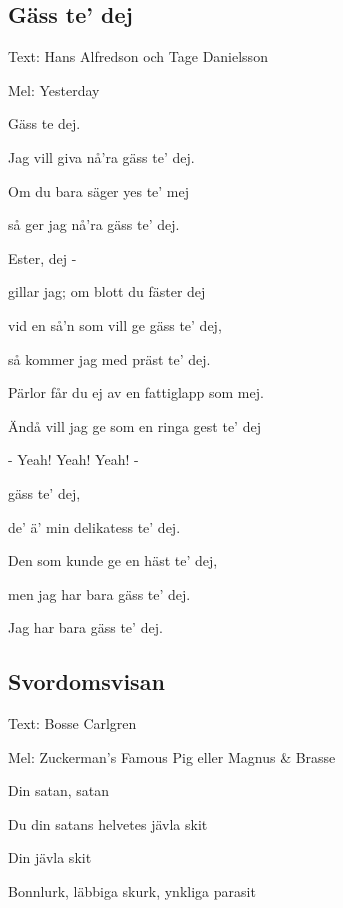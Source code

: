 

\pagestyle{Övriga visor}



\subsection{\textbf{Gäss te’ dej}}

Text: Hans Alfredson och Tage Danielsson

Mel: Yesterday \bigskip


Gäss te dej.

Jag vill giva nå’ra gäss te’ dej.

Om du bara säger yes te’ mej

så ger jag nå’ra gäss te’ dej.

Ester, dej -

gillar jag; om blott du fäster dej

vid en så’n som vill ge gäss te’ dej,

så kommer jag med präst te’ dej. \bigskip



Pärlor får du ej av en fattiglapp som mej.

Ändå vill jag ge som en ringa gest te’ dej

- Yeah! Yeah! Yeah! - \bigskip



gäss te’ dej,

de’ ä’ min delikatess te’ dej.

Den som kunde ge en häst te’ dej,

men jag har bara gäss te’ dej.

Jag har bara gäss te’ dej. \bigskip

\subsection{\textbf{Svordomsvisan}}

Text: Bosse Carlgren

Mel: Zuckerman’s Famous Pig eller Magnus \& Brasse\bigskip

Din satan, satan

Du din satans helvetes jävla skit

Din jävla skit\bigskip



Bonnlurk, läbbiga skurk, ynkliga parasit

